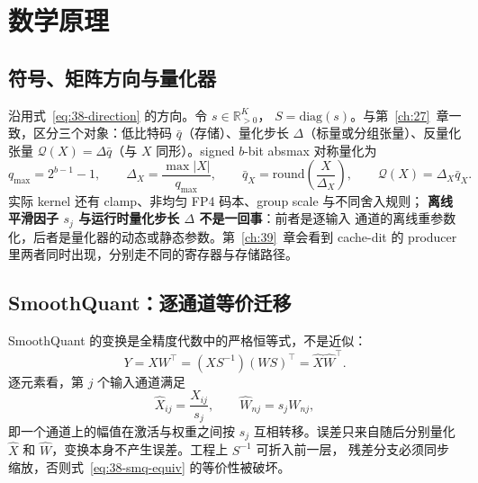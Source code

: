 \section{数学原理}

\subsection{符号、矩阵方向与量化器}\label{sec:38-notation}

沿用式~\ref{eq:38-direction} 的方向。令 $s\in\mathbb{R}_{>0}^{K}$，
$S=\mathrm{diag}(s)$。与第~\ref{ch:27}~章一致，区分三个对象：低比特码
$\bar q$（存储）、量化步长 $\Delta$（标量或分组张量）、反量化张量
$\mathcal Q(X)=\Delta\bar q$（与 $X$ 同形）。signed $b$-bit absmax 对称量化为
\begin{equation}
  q_{\max}=2^{b-1}-1,\qquad
  \Delta_X=\frac{\max|X|}{q_{\max}},\qquad
  \bar q_X=\mathrm{round}\!\left(\frac{X}{\Delta_X}\right),\qquad
  \mathcal Q(X)=\Delta_X\bar q_X.
  \label{eq:38-absmax}
\end{equation}
实际 kernel 还有 clamp、非均匀 FP4 码本、group scale 与不同舍入规则；
\textbf{离线平滑因子 $s_j$ 与运行时量化步长 $\Delta$ 不是一回事}：前者是逐输入
通道的离线重参数化，后者是量化器的动态或静态参数。第~\ref{ch:39}~章会看到
cache-dit 的 producer 里两者同时出现，分别走不同的寄存器与存储路径。

\subsection{SmoothQuant：逐通道等价迁移}\label{sec:38-smq}

SmoothQuant 的变换是全精度代数中的严格恒等式，不是近似：
\begin{equation}
  Y=XW^{\top}=(XS^{-1})(WS)^{\top}=\widehat X\widehat W^{\top}.
  \label{eq:38-smq-equiv}
\end{equation}
逐元素看，第 $j$ 个输入通道满足
\begin{equation}
  \widehat X_{ij}=\frac{X_{ij}}{s_j},\qquad
  \widehat W_{nj}=s_jW_{nj},
  \label{eq:38-smq-elem}
\end{equation}
即一个通道上的幅值在激活与权重之间按 $s_j$ 互相转移。误差只来自随后分别量化
$\widehat X$ 和 $\widehat W$，变换本身不产生误差。工程上 $S^{-1}$ 可折入前一层，
残差分支必须同步缩放，否则式~\ref{eq:38-smq-equiv} 的等价性被破坏。

